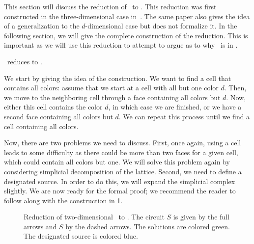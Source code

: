 This section will discuss the reduction of \Sperner\ to \EndOfLine. This reduction was first constructed in the three-dimensional case in~. The same paper also gives the idea of a generalization to the $d$-dimensional case but does not formalize it. In the following section, we will give the complete construction of the reduction. This is important as we will use this reduction to attempt to argue as to why \Tarskistar\ is in \EOPL\@.

\begin{theorem}
	\Sperner\ reduces to \EndOfLine.
\end{theorem}

We start by giving the idea of the construction. We want to find a cell that contains all colors: assume that we start at a cell with all but one color $d$. Then, we move to the neighboring cell through a face containing all colors but $d$. Now, either this cell contains the color $d$, in which case we are finished, or we have a second face containing all colors but $d$. We can repeat this process until we find a cell containing all colors.

Now, there are two problems we need to discuss. First, once again, using a cell leads to some difficulty as there could be more than two faces for a given cell, which could contain all colors but one. We will solve this problem again by considering simplicial decomposition of the lattice. Second, we need to define a designated source. In order to do this, we will expand the simplicial complex slightly. We are now ready for the formal proof; we recommend the reader to follow along with the construction in \cref{fig:sperner_eol_reduction}.

\begin{figure}
	\centering
	\caption[Reduction of \Sperner\ to \EndOfLine]{Reduction of two-dimensional \Sperner\ to \EndOfLine. The circuit $S$ is given by the full arrows and $S$ by the dashed arrows. The solutions are colored green. The designated source is colored blue.}\label{fig:sperner_eol_reduction}
\end{figure}

